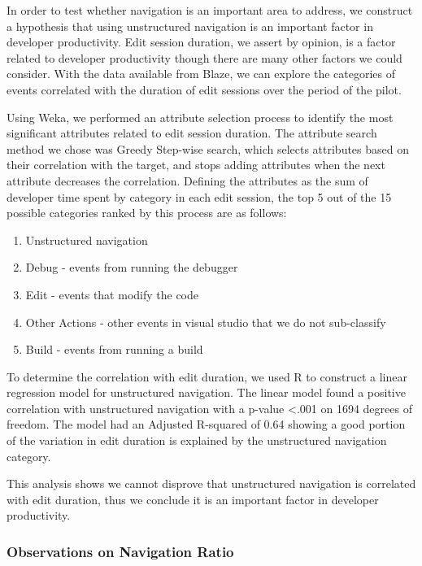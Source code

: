 \documentclass{sig-alternate}
\begin{document}
In order to test whether navigation is an important area to address, we construct a hypothesis that using unstructured navigation is an important factor in developer productivity.  Edit session duration, we assert by opinion, is a factor related to developer productivity though there are many other factors we could consider.  With the data available from Blaze, we can explore the categories of events correlated with the duration of edit sessions over the period of the pilot.  

Using Weka\cite{Hall2009WEKA}, we performed an attribute selection process to identify the most significant attributes related to edit session duration.  The attribute search method we chose was Greedy Step-wise search, which selects attributes based on their correlation with the target, and stops adding attributes when the next attribute decreases the correlation.    Defining the attributes as the sum of developer time spent by category in each edit session, the top 5 out of the 15 possible categories ranked by this process are as follows:
\begin{enumerate}[itemsep=0mm]
\item Unstructured navigation
\item Debug - events from running the debugger
\item Edit - events that modify the code
\item Other Actions - other events in visual studio that we do not sub-classify
\item Build - events from running a build
\end{enumerate}

To determine the correlation with edit duration, we used R\cite{Rcitation} to construct a linear regression model for unstructured navigation.  The linear model found a positive correlation with unstructured navigation with a p-value <.001 on 1694 degrees of freedom.  The model had an Adjusted R-squared of 0.64 showing a good portion of the variation in edit duration is explained by the unstructured navigation category. 

This analysis shows we cannot disprove that unstructured navigation is correlated with edit duration, thus we conclude it is an important factor in developer productivity.  

\subsubsection{Observations on Navigation Ratio}
\end{document}
